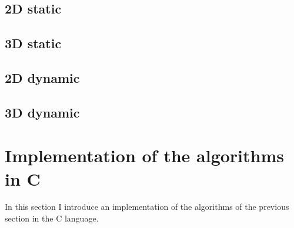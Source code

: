 \documentclass[12pt, a4paper]{article}
\begin{document}
\subsection{2D static}

\begin{scriptsize}
\begin{ttfamily}

\end{ttfamily}
\end{scriptsize}

\subsection{3D static}

\begin{scriptsize}
\begin{ttfamily}

\end{ttfamily}
\end{scriptsize}

\subsection{2D dynamic}

\begin{scriptsize}
\begin{ttfamily}

\end{ttfamily}
\end{scriptsize}

\subsection{3D dynamic}

\begin{scriptsize}
\begin{ttfamily}

\end{ttfamily}
\end{scriptsize}

\section{Implementation of the algorithms in C}

In this section I introduce an implementation of the algorithms of the previous section in the C language.\\
\end{document}

